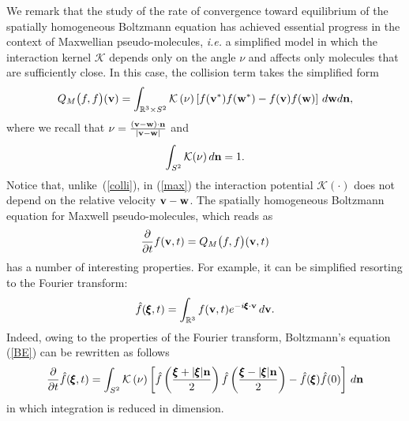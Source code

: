 \documentclass{article}
\newcommand{\bv}{\mathrm{BV}}
\newcommand{\f}{{\ensuremath{\varphi}}}
\newcommand{\fer}[1]{(\ref{#1})}
\newcommand{\R}{\mathbb R}
\def\f{\hat f}
\def\R{\mathbb{R}}
\def\bv{{\bf v}}
\def\bw{{\bf w}}
\def\bxi{{\pmb\xi}}
\begin{document}
% 
We remark that the study of the rate of convergence toward equilibrium of the spatially homogeneous Boltzmann equation has achieved essential progress in the context of Maxwellian pseudo-molecules, \textit{i.e.} a simplified model in which the interaction kernel $\mathcal{K}$ depends only on the angle $\nu$ and affects only molecules that are sufficiently close.\cite{Bob1}
% 
In this case, the collision term takes the simplified form
\begin{equation}
    \label{max}
    Q_M\bigl(f,f\bigr)(\bv) = \int_{{\R}^3\times{S^2}} \mathcal{K}\left(\nu\right) \left[ f( \bv^*)f( \bw^*)- f( \bv)f( \bw)\right] \, d \bw d{\bf n},
\end{equation}
where we recall that $\nu=\frac{(\bv-\bw)\cdot {\bf n}}{|\bv-\bw|}$ and
% 
\[
    \int_{{S^2}} \mathcal{K}(\nu)\, d{\bf n} = 1.
\]
% 
Notice that, unlike~\fer{colli}, in \fer{max} the interaction potential $\mathcal{K}(\cdot)$ does not depend on the relative velocity $\bv -\bw$.
% 
The spatially homogeneous Boltzmann equation for Maxwell pseudo-molecules,\cite{Cer,CIP} which reads as
% 
\begin{equation}
    \label{BE}
    {\partial\over \partial t}f(\bv,t) = Q_M\bigl(f,f\bigr)(\bv,t)
\end{equation}
% 
has a number of interesting properties. 
% 
For example, it can be simplified resorting to the Fourier transform:\cite{Bob1} 
% 
\begin{equation}\label{eq:Fourier}
    \f(\bxi,t) = \int_{\R^3} f(\bv,t) e^{-i\bxi\cdot\bv}\, d\bv.
\end{equation}
% 
Indeed, owing to the properties of the Fourier transform, Boltzmann's equation \fer{BE} can be rewritten as follows
% 
\begin{equation}
    \label{BEF}
    {\partial\over \partial t}\f(\bxi,t) = \int_{{S^2}} \mathcal{K}\left(\nu\right) \left[\f\left( \frac{\bxi +|\bxi|{\bf n}}2\right)\f\left( \frac{\bxi -|\bxi|{\bf n}}2\right)- \f( \bxi)\f(0)\right] \,  d{\bf n}
\end{equation}
% 
in which integration is reduced in dimension. 



\end{document}
